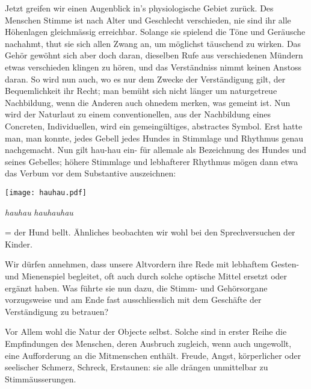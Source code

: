 Jetzt greifen wir einen Augenblick in’s physiologische Gebiet zurück. Des Menschen Stimme ist nach Alter und Geschlecht verschieden, nie sind ihr alle Höhenlagen gleichmässig erreichbar. Solange sie spielend \label{fp.302} die Töne und Geräusche nachahmt, thut sie sich allen Zwang an, um möglichst täuschend zu wirken. Das Gehör gewöhnt sich aber doch daran, dieselben Rufe aus verschiedenen Mündern etwas verschieden klingen zu hören, und das Verständniss nimmt keinen Anstoss daran. So wird nun auch, wo es nur dem Zwecke der Verständigung gilt, der Bequemlichkeit ihr Recht; man bemüht sich nicht länger um naturgetreue Nachbildung, wenn die Anderen  auch ohnedem merken, was gemeint ist. Nun wird der Naturlaut zu einem conventionellen, aus der Nachbildung eines Concreten, Individuellen, wird ein gemeingültiges, abstractes Symbol. Erst hatte man,  man konnte, jedes Gebell jedes Hundes in Stimmlage und Rhythmus genau nachgemacht. Nun gilt hau-hau ein- für allemale als Bezeichnung des Hundes und seines Gebelles; höhere Stimmlage und lebhafterer Rhythmus mögen dann etwa das Verbum vor dem Substantive auszeichnen:

\begin{center}
\texttt{[image: hauhau.pdf]}\\[-.1em]
\parbox{5cm}{\small\hspace*{10.5mm}\textit{hauhau} \hspace*{9mm} \textit{hauhauhau}\\}
\end{center}

\noindent = der Hund bellt. Ähnliches beobachten wir wohl bei den Sprechversuchen der Kinder. 

Wir dürfen annehmen, dass unsere Altvordern ihre Rede mit lebhaftem Gesten- und Mienenspiel begleitet, oft auch durch solche optische Mittel ersetzt \label{sp.312} oder ergänzt haben. Was führte sie nun dazu, die Stimm- und Gehörsorgane vorzugsweise und am Ende fast ausschliesslich mit dem Geschäfte der Verständigung zu betrauen?

Vor Allem wohl die Natur der Objecte selbst. Solche sind in erster Reihe die Empfindungen des Menschen, deren Ausbruch zugleich, wenn auch ungewollt, eine Aufforderung an die Mitmenschen enthält. Freude, Angst, körperlicher oder seelischer Schmerz, Schreck, Erstaunen: sie alle drängen unmittelbar zu Stimmäusserungen.

